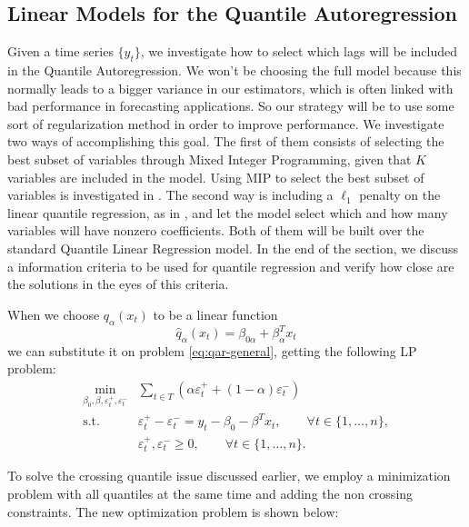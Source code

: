 \subsection{Linear Models for the Quantile Autoregression}
\label{sec:linear-models}

Given a time series $\{y_t\}$, we investigate how to select which lags will be included in the Quantile Autoregression. We won't be choosing the full model because this normally leads to a bigger variance in our estimators, which is often linked with bad performance in forecasting applications. So our strategy will be to use some sort of regularization method in order to improve performance.
We investigate two ways of accomplishing this goal.
The first of them consists of selecting the best subset of variables through Mixed Integer Programming, given that $K$ variables are included in the model. Using MIP to select the best subset of variables is investigated in \cite{bertsimas2015best}. The second way is including a $\ell_1$ penalty on the linear quantile regression, as in \cite{kim2009ell_1}, and let the model select which and how many variables will have nonzero coefficients. 
Both of them will be built over the standard Quantile Linear Regression model. In the end of the section, we discuss a information criteria to be used for quantile regression and verify how close are the solutions in the eyes of this criteria.

When we choose $q_\alpha(x_t)$ to be a linear function
\begin{equation}
\hat{q}_\alpha(x_t) = \beta_{0\alpha} + \beta_\alpha^T x_t
\end{equation}
we can substitute it on problem \ref{eq:qar-general}, getting the following LP problem:
\begin{equation}
\begin{aligned}
 \underset{\beta_0,\beta,\varepsilon_{t}^{+},\varepsilon_{t}^{-}}{\text{min}} & \sum_{t \in T}\left(\alpha\varepsilon_{t}^{+}+(1-\alpha)\varepsilon_{t}^{-}\right) \\
\mbox{s.t. } & \varepsilon_{t}^{+}-\varepsilon_{t}^{-}=y_{t} - \beta_0 - \beta^T x_{t},\qquad\forall t\in\{1,\dots,n\},\\
& \varepsilon_t^+,\varepsilon_t^- \geq 0, \qquad \forall t \in \{1,\dots,n\}.
\end{aligned}
\label{eq:qar-lp}
\end{equation}

To solve the crossing quantile issue discussed earlier, we employ a minimization problem with all quantiles at the same time and adding the non crossing constraints. The new optimization problem is shown below:


